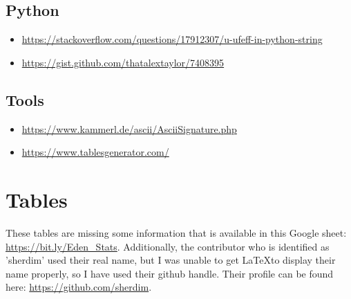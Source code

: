 \documentclass[a4paper,man,natbib,floatsintext]{apa6}
\begin{document}
  \subsection{Python}
  \begin{itemize}
    \item \url{https://stackoverflow.com/questions/17912307/u-ufeff-in-python-string}
    \item \url{https://gist.github.com/thatalextaylor/7408395}
  \end{itemize}


  \subsection{Tools}
  \begin{itemize}
    \item \url{https://www.kammerl.de/ascii/AsciiSignature.php}
    \item \url{https://www.tablesgenerator.com/}
  \end{itemize}

  

   \section{Tables}
   These tables are missing some information that is available in this Google sheet: \url{https://bit.ly/Eden_Stats}. Additionally, the contributor who is identified as 'sherdim' used their real name, but I was unable to get \LaTeX to display their name properly, so I have used their github handle. Their profile can be found here: \url{https://github.com/sherdim}.
\end{document}
